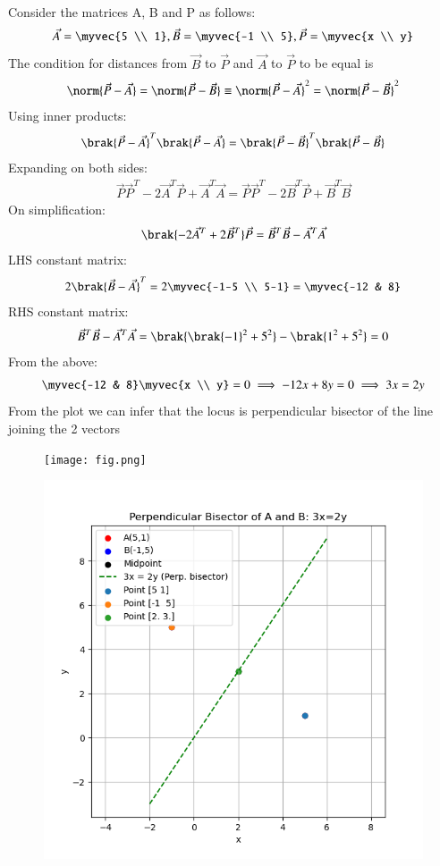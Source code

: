 \documentclass[journal]{IEEEtran}
\begin{document}
	\solution \\
	Consider the matrices A, B and P as follows:
	\begin{align*}
		\vec{A} = \myvec{5 \\ 1}, \vec{B} = \myvec{-1 \\ 5}, \vec{P}= \myvec{x \\ y}
	\end{align*}
	The condition for distances from $\vec{B}$ to $\vec{P}$ and $\vec{A}$ to $\vec{P}$ to be equal is
	\begin{align*}
		\norm{\vec{P}-\vec{A}} = \norm{\vec{P}-\vec{B}} \equiv \norm{\vec{P}-\vec{A}}^2 = \norm{\vec{P}-\vec{B}}^2
	\end{align*}
	Using inner products:
	\begin{align*}
		\brak{\vec{P}-\vec{A}}^{T}\brak{\vec{P}-\vec{A}} = \brak{\vec{P}-\vec{B}}^{T}\brak{\vec{P}-\vec{B}}
	\end{align*}
	Expanding on both sides:
	\begin{align*}
		\vec{P}\vec{P}^{T} - 2\vec{A}^{T}\vec{P} + \vec{A}^{T}\vec{A} = \vec{P}\vec{P}^{T} - 2\vec{B}^{T}\vec{P} + \vec{B}^{T}\vec{B}
	\end{align*}
	On simplification:
	\begin{align*}
		\brak{-2\vec{A}^{T} + 2\vec{B}^{T}}\vec{P} = \vec{B}^{T}\vec{B} - \vec{A}^{T}\vec{A}
	\end{align*} 
	LHS constant matrix:
	\begin{align*}
	2\brak{\vec{B}-\vec{A}}^{T} = 2\myvec{-1-5 \\ 5-1} = \myvec{-12 & 8}	
	\end{align*}
	RHS constant matrix:
	\begin{align*}
		\vec{B}^{T}\vec{B} - \vec{A}^{T}\vec{A} = \brak{\brak{-1}^2 + 5^2} - \brak{1^2 + 5^2} = 0
	\end{align*}
	From the above:
	\begin{align*}
		\myvec{-12 & 8}\myvec{x \\ y} = 0 \implies -12x + 8y = 0 \implies 3x = 2y
	\end{align*}
	From the plot we can infer that the locus is perpendicular bisector of the line joining the 2 vectors 
	\begin{figure}[H]
		\centering
		\texttt{[image: fig.png]}
		\caption*{}
		\label{fig1}
	\end{figure}
	\begin{figure}[H]
	\centering
	\includegraphics[width = 0.8\columnwidth]{Figure_2.png}
	\caption*{}
	\label{fig2}
\end{figure}
\end{document}
